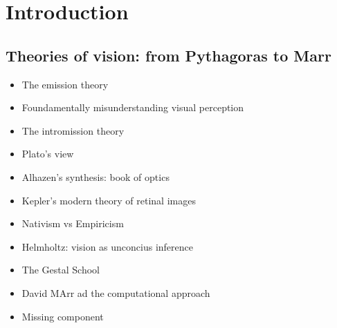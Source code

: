 \documentclass[12pt,oneside]{report}
\newcommand{\newblanckpage}{
    \newpage
    \thispagestyle{plain} %
    \mbox{}
}
\begin{document}

\restoregeometry




\tableofcontents

\clearpage


\setcounter{page}{1}





\chapter{Introduction}
\section{Theories of vision: from Pythagoras to Marr}
\begin{itemize}
    \item The emission theory
    \item Foundamentally misunderstanding visual perception
    \item The intromission theory
    \item Plato's view
    \item Alhazen's synthesis: book of optics
    \item Kepler's modern theory of retinal images
    \item Nativism vs Empiricism
    \item Helmholtz: vision as unconcius inference
    \item The Gestal School
    \item David MArr ad the computational approach
    \item Missing component
\end{itemize}
\end{document}
